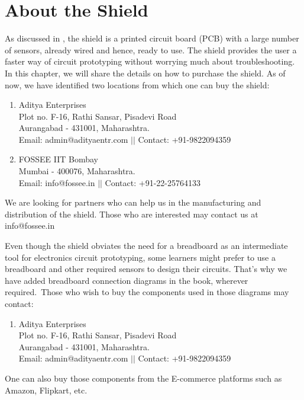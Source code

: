 \appendix
\chapter{About the Shield}\label{shield-appendix}
As discussed in , the shield is a printed circuit board (PCB) with a large number of sensors, already
wired and hence, ready to use. The shield provides the user a faster way of circuit prototyping without worrying
much about troubleshooting. In this chapter, we will share the details on how to purchase the shield.  As of now, we have identified two locations from which one can buy the shield:
\begin{enumerate}
    \item Aditya Enterprises \\
          Plot no. F-16, Rathi Sansar, Pisadevi Road \\ Aurangabad - 431001, Maharashtra. \\
          Email: admin@adityaentr.com $||$
          Contact: +91-9822094359
    \item FOSSEE IIT Bombay \\
          Mumbai - 400076, Maharashtra. \\
          Email: info@fossee.in $||$
          Contact: +91-22-25764133
\end{enumerate}
We are looking for partners who can help us in the manufacturing and distribution of the shield. Those who are interested may contact us at info@fossee.in

Even though the shield obviates the need for a breadboard as an intermediate tool for electronics circuit prototyping, some learners might prefer to use a breadboard and other required sensors to design their circuits. That's why we have added breadboard connection diagrams in the book, wherever required. Those who wish to buy the components used in those diagrams may contact:
\begin{enumerate}
    \item Aditya Enterprises \\
          Plot no. F-16, Rathi Sansar, Pisadevi Road \\ Aurangabad - 431001, Maharashtra. \\
          Email: admin@adityaentr.com $||$
          Contact: +91-9822094359
\end{enumerate}
One can also buy those components from the E-commerce platforms such as Amazon, Flipkart, etc.
